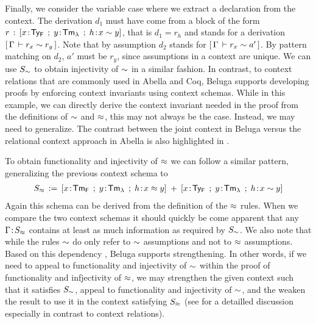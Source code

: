 

Finally, we consider the variable case where we extract a declaration from the context. The derivation $d_1$ must have come from a block of the form $r \mathrel{\, : \,} [x\!:\!\mathsf{Ty_{F}} \mathrel{\, ; \,} y\!:\!\mathsf{Tm_{\lambda}} \mathrel{\, ; \,} h \!:\! x \mathrel{\sim} y]$, that is $d_1 = r_h$ and stands for a derivation
$[\,\Gamma\,\vdash r_x \mathrel{\sim} r_y\,]$. Note that by assumption $d_2$ stands for $[\,\Gamma\,\vdash r_x \mathrel{\sim} a'\,]$.  By pattern matching on $d_2$, $a'$ must be $r_y$, since assumptions in a context are unique.
We can use $S_{\mathrel{\sim}}$ to obtain injectivity of $\mathrel{\sim}$ in a similar fashion.
%
In contrast, to context relations that are commonly used in Abella and Coq, Beluga supports developing proofs by enforcing context invariants using context schemas. While in this example, we can directly derive the context invariant needed in the proof from the definitions of $\mathrel{\sim}$ and $\mathrel{\approx}$, this may not always be the case.  Instead, we may need to generalize. The contrast between the joint context in Beluga versus the relational context approach in Abella is also highlighted in \cite{Felty:ITP10,Felty:orbi-survey}.


To obtain functionality and injectivity of $\mathrel{\approx}$ we can follow a similar pattern, generalizing the previous context schema  to
\begin{align*}
  S_{\tmr} \eqdef [x\of\TmF \mrel{;} y\of\TmL \mrel{;} h\of x \tmr y] \mrel{+} [x\of\TyF \mrel{;} y\of\TmL \mrel{;} h\of x \tyr y]
\end{align*}
Again this schema can be derived from the definition of the $\mathrel{\approx}$ rules.
When we compare the two context schemas it should quickly be come apparent that any $\Gamma \!:\! S_{\mathrel{\approx}}$ contains at least as much information as required by $S_{\mathrel{\sim}}$. We also note that while the rules $\mathrel{\sim}$ do only refer to $\mathrel{\sim}$ assumptions and not to $\mathrel{\approx}$ assumptions. Based on this dependency \cite{Virga99phd}, Beluga supports strengthening. In other words, if we need to appeal to functionality and injectivity of $\mathrel{\sim}$ within the proof of functionality and infjectivity of $\mathrel{\approx}$, we may strengthen the given context such that it satisfies $S_{\mathrel{\sim}}$, appeal to functionality and injectivity of $\mathrel{\sim}$, and the weaken the result to use it in the context satisfying $S_{\mathrel{\approx}}$ (see \cite{Felty:orbi-survey} for a detailled discussion especially in contrast to context relations).


